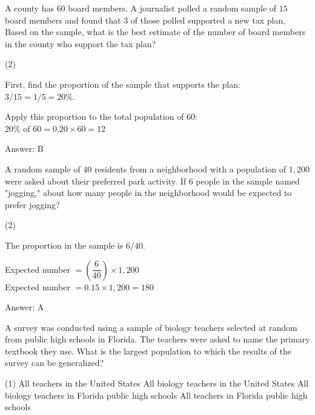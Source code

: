 \documentclass[11pt,paper=a4,answers]{exam}
\begin{document}
\begin{questions}
\question
A county has $60$ board members. A journalist polled a random sample of $15$ board members and found that $3$ of those polled supported a new tax plan. Based on the sample, what is the best estimate of the number of board members in the county who support the tax plan?
\begin{tasks}(2)
\end{tasks}

\begin{solution}
First, find the proportion of the sample that supports the plan: $3/15 = 1/5 = 20\%$.
\vspace{5pt}
\begin{center}
Apply this proportion to the total population of $60$: \\
$20\% \text{ of } 60 = 0.20 \times 60 = 12$
\end{center}
\vspace{5pt}
Answer: \colorbox{yellow!100}{B}
\end{solution}

\vspace{1cm}

\question
A random sample of $40$ residents from a neighborhood with a population of $1,200$ were asked about their preferred park activity. If $6$ people in the sample named "jogging," about how many people in the neighborhood would be expected to prefer jogging?
\begin{tasks}(2)
\end{tasks}

\begin{solution}
The proportion in the sample is $6/40$.
\vspace{5pt}
\begin{center}
Expected number $= \left( \dfrac{6}{40} \right) \times 1,200$ \\
Expected number $= 0.15 \times 1,200 = 180$
\end{center}
\vspace{5pt}
Answer: \colorbox{yellow!100}{A}
\end{solution}

\vspace{1cm}

\question
A survey was conducted using a sample of biology teachers selected at random from public high schools in Florida. The teachers were asked to name the primary textbook they use. What is the largest population to which the results of the survey can be generalized?
\begin{tasks}(1)
    \task All teachers in the United States
    \task All biology teachers in the United States
    \task All biology teachers in Florida public high schools
    \task All teachers in Florida public high schools
\end{tasks}


\end{questions}
\end{document}
